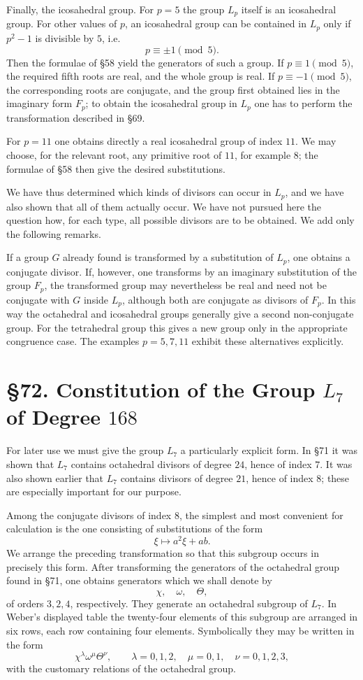 \documentclass[11pt,a4paper]{book}
\newcommand{\webersection}[2]{\clearpage\section*{\S #1. #2}}
\begin{document}
Finally, the icosahedral group.  For \(p=5\) the group \(L_p\) itself is an icosahedral group.  For other values of \(p\), an icosahedral group can be contained in \(L_p\) only if \(p^2-1\) is divisible by \(5\), i.e.
\[
 p\equiv \pm1\pmod5.
\]
Then the formulae of \S 58 yield the generators of such a group.  If \(p\equiv1\pmod5\), the required fifth roots are real, and the whole group is real.  If \(p\equiv-1\pmod5\), the corresponding roots are conjugate, and the group first obtained lies in the imaginary form \(F_p\); to obtain the icosahedral group in \(L_p\) one has to perform the transformation described in \S 69.

For \(p=11\) one obtains directly a real icosahedral group of index \(11\).  We may choose, for the relevant root, any primitive root of \(11\), for example \(8\); the formulae of \S 58 then give the desired substitutions.

We have thus determined which kinds of divisors can occur in \(L_p\), and we have also shown that all of them actually occur.  We have not pursued here the question how, for each type, all possible divisors are to be obtained.  We add only the following remarks.

If a group \(G\) already found is transformed by a substitution of \(L_p\), one obtains a conjugate divisor.  If, however, one transforms by an imaginary substitution of the group \(F_p\), the transformed group may nevertheless be real and need not be conjugate with \(G\) inside \(L_p\), although both are conjugate as divisors of \(F_p\).  In this way the octahedral and icosahedral groups generally give a second non-conjugate group.  For the tetrahedral group this gives a new group only in the appropriate congruence case.  The examples \(p=5,7,11\) exhibit these alternatives explicitly.

\webersection{72}{Constitution of the Group \(L_7\) of Degree \(168\)}

For later use we must give the group \(L_7\) a particularly explicit form.  In \S 71 it was shown that \(L_7\) contains octahedral divisors of degree \(24\), hence of index \(7\).  It was also shown earlier that \(L_7\) contains divisors of degree \(21\), hence of index \(8\); these are especially important for our purpose.

Among the conjugate divisors of index \(8\), the simplest and most convenient for calculation is the one consisting of substitutions of the form
\[
 \xi\longmapsto a^2\xi+ab .
\]
We arrange the preceding transformation so that this subgroup occurs in precisely this form.  After transforming the generators of the octahedral group found in \S 71, one obtains generators which we shall denote by
\[
 \chi,\quad \omega,\quad \Theta,
\]
of orders \(3,2,4\), respectively.  They generate an octahedral subgroup of \(L_7\).  In Weber's displayed table the twenty-four elements of this subgroup are arranged in six rows, each row containing four elements.  Symbolically they may be written in the form
\[
 \chi^\lambda \omega^\mu \Theta^\nu,\qquad
 \lambda=0,1,2,\quad \mu=0,1,\quad \nu=0,1,2,3,
\]
with the customary relations of the octahedral group.
\end{document}
